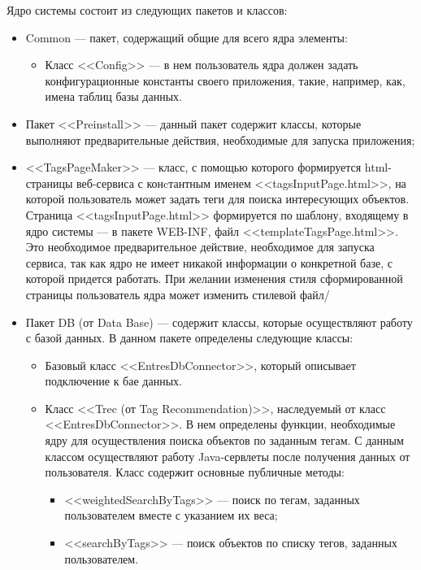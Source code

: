 Ядро системы состоит из следующих пакетов и классов:
\begin{itemize}
	\item Common --- пакет, содержащий общие для всего ядра элементы:
		\begin{itemize}
			\item Класс <<Config>> --- в нем пользователь ядра должен задать
				конфигурационные константы своего приложения, такие, например, как,
				имена таблиц базы данных.
		\end{itemize}
	\item Пакет <<Preinstall>> --- данный пакет содержит классы,
		которые выполняют предварительные действия, необходимые для запуска
		приложения;
	\item <<TagsPageMaker>> --- класс, с помощью которого формируется
		html-страницы веб-сервиса с конcтантным
		  именем <<tagsInputPage.html>>, на которой
		  пользователь может задать теги для поиска интересующих объектов.
		  Страница <<tagsInputPage.html>> формируется по шаблону,
		  входящему в ядро системы --- в пакете WEB-INF,
		  файл <<templateTagsPage.html>>. Это необходимое предварительное
		  действие, необходимое для запуска сервиса, так как ядро не имеет
		  никакой информации о конкретной базе, с которой придется работать.
		  При желании изменения стиля сформированной страницы пользователь ядра
		  может изменить стилевой файл/
	  \item Пакет DB (от Data Base) --- содержит классы, которые осуществляют
		  работу с базой данных. В данном пакете определены следующие классы:
		  \begin{itemize}
			  \item Базовый класс <<EntresDbConnector>>, который описывает
				  подключение к бае данных.
			  \item Класс <<Trec (от Tag Recommendation)>>, наследуемый от
				  класс <<EntresDbConnector>>. В нем определены функции, необходимые ядру
				  для осуществления поиска объектов по заданным тегам. С данным классом осуществляют работу Java-сервлеты после получения данных от пользователя.
				  Класс содержит основные публичные методы:
				  \begin{itemize}
					  \item <<weightedSearchByTags>> --- поиск по тегам,
						  заданных пользователем вместе с указанием их веса;
					  \item <<searchByTags>> --- поиск объектов по списку
						  тегов, заданных пользователем.
				  \end{itemize}

\end{itemize}
\end{itemize}
